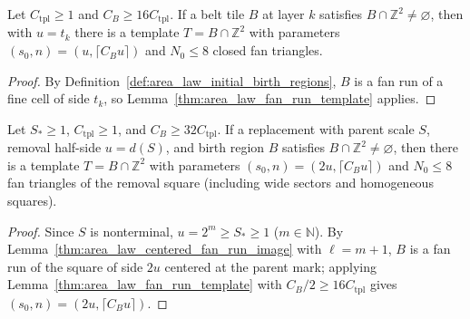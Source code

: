 \begin{lemma}
    \label{thm:area_law_belt_templates}
    \leanok
    Let $C_{\mathrm{tpl}}\ge1$ and $C_B\ge16C_{\mathrm{tpl}}$. If a belt tile
    $B$ at layer $k$ satisfies $B\cap\mathbb Z^2\ne\varnothing$, then with
    $u=t_k$ there is a template $T=B\cap\mathbb Z^2$ with parameters
    $(s_0,n)=(u,\lceil C_Bu\rceil)$ and $N_0\le8$ closed fan triangles.
\end{lemma}
\begin{proof}\leanok
    By Definition~\ref{def:area_law_initial_birth_regions}, $B$ is a fan run of
    a fine cell of side $t_k$, so Lemma~\ref{thm:area_law_fan_run_template}
    applies.
\end{proof}

\begin{lemma}
    \label{thm:area_law_replacement_templates}
    \leanok
    Let $S_*\ge1$, $C_{\mathrm{tpl}}\ge1$, and $C_B\ge32C_{\mathrm{tpl}}$. If a
    replacement with parent scale $S$, removal half-side $u=d(S)$, and birth
    region $B$ satisfies $B\cap\mathbb Z^2\ne\varnothing$, then there is a
    template $T=B\cap\mathbb Z^2$ with parameters
    $(s_0,n)=(2u,\lceil C_Bu\rceil)$ and $N_0\le8$ fan triangles of the removal
    square (including wide sectors and homogeneous squares).
\end{lemma}
\begin{proof}\leanok
    Since $S$ is nonterminal, $u=2^m\ge S_*\ge1$ ($m\in\mathbb N$). By
    Lemma~\ref{thm:area_law_centered_fan_run_image} with $\ell=m+1$, $B$ is a
    fan run of the square of side $2u$ centered at the parent mark; applying
    Lemma~\ref{thm:area_law_fan_run_template} with
    $C_B/2\ge16C_{\mathrm{tpl}}$ gives $(s_0,n)=(2u,\lceil C_Bu\rceil)$.
\end{proof}

